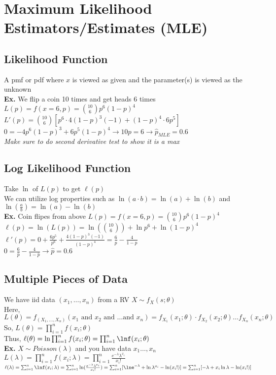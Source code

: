 \documentclass{article}
\begin{document}
\section{Maximum Likelihood Estimators/Estimates (MLE)}
\label{sec:MLE}
\subsection{Likelihood Function}
A pmf or pdf where $x$ is viewed as given and the parameter(s) is viewed as the unknown\\
\textbf{Ex.} We flip a coin 10 times and get heads $6$ times\\
$L(p)=f(x=6,p)=\binom{10}{6}p^6(1-p)^4$\\
$L'(p)=\binom{10}{6}[p^6\cdot4(1-p)^3(-1)+(1-p)^4\cdot6p^5]$\\
$0=-4p^6(1-p)^3+6p^5(1-p)^4 \rightarrow 10p=6\rightarrow \hat p_{MLE}=0.6$\\
\textit{Make sure to do second derivative test to show it is a max}
\subsection{Log Likelihood Function}
Take $\ln$ of $L(p)$ to get $\ell(p)$\\
We can utilize log properties such as $\ln(a\cdot b)=\ln(a)+\ln(b)$ and $\ln(\frac{a}{b})=\ln(a)-\ln(b)$\\
\textbf{Ex.} Coin flipes from above
$L(p)=f(x=6,p)=\binom{10}{6}p^6(1-p)^4$\\
$\ell(p)=\ln(L(p))=\ln(\binom{10}{6})+\ln p^6+\ln(1-p)^4$\\
$\ell'(p)=0+\frac{6p^5}{p^6}+\frac{4(1-p)^3(-1)}{(1-p)^4}=\frac{6}{p}-\frac{4}{1-p}$\\
$0=\frac{6}{\hat p}-\frac{4}{1-\hat p} \rightarrow \hat p = 0.6$
\subsection{Multiple Pieces of Data}
We have iid data $(x_1,\dots,x_n)$ from a RV $X\sim f_X(s;\theta)$\\
Here, $L(\theta)=f_{(X_1,\dots,X_n)}(x_1 \text{ and }x_2 \text{ and } \dots\text{and }x_n)=f_{X_1}(x_1;\theta)\cdot f_{X_2}(x_2;\theta)\dots f_{X_n}(x_n;\theta)$\\
So, $L(\theta)=\prod_{i=1}^nf(x_i;\theta)$\\
Thus, $\ell(\theta)=\ln\prod_{i=1}^nf(x_i;\theta)=\prod_{i=1}^n\lnf(x_i;\theta)$\\
\textbf{Ex.} $X\sim Poisson(\lambda)$ and you have data $x_1\dots,x_n$\\
$L(\lambda)=\prod_{i=1}^nf(x_i;\lambda)=\prod_{i=1}^n\frac{e^{-\lambda}\lambda^{x_i}}{x_i!}$\\
$\ell(\lambda)=\sum_{i=1}^n\lnf(x_i;\lambda)=\sum_{i=1}^n\ln(\frac{e^{-\lambda}\lambda^{x_i}}{x_i!})=\sum_{i=1}^n[\lne^{-\lambda}+\ln\lambda^{x_i}-\ln(x_i!)]=\sum_{i=1}^n[-\lambda+x_i\ln\lambda-\ln(x_i!)]$
\end{document}
